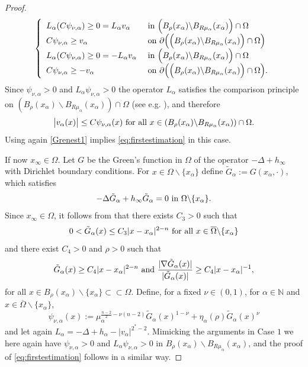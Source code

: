 \documentclass[10pt]{amsart}
\numberwithin{equation}{section}
\newcommand{\Om}{\Omega}
\newcommand{\ma}{\mu_\alpha}
\def \bb{\hbox}
\def \xl{x_\alpha}
\def\la{\alpha}
\def \ma{\mu_{\alpha}}
\def \nn{\mathbb{N}}
\def \ro{\rho}
\theoremstyle{plain}
\theoremstyle{remark}
\begin{document}
\begin{proof}
\begin{equation}\label{eq:critlambda}
\left\{\begin{array}{ll}
L_{\la} (C\psi_{\nu,\la})\geq 0=L_{\la} v_{\la} &\hbox{ in }\Big( B_{\ro}(\xl) \backslash B_{R\ma}(\xl)\Big) \cap \Om\\
C\psi_{\nu,\la}\geq  v_{\la}&\hbox{ on }\partial \Big( \Big( B_{\ro}(\xl) \backslash B_{R\ma}(\xl)\Big) \cap \Om\Big)\\
L_{\la}(C\psi_{\nu,\la})\geq 0=-L_{\la} v_{\la} &\hbox{ in }  \Big( B_{\ro}(\xl) \backslash B_{R\ma}(\xl)\Big) \cap \Om\\
C\psi_{\nu,\la}\geq  -v_{\la}&\hbox{ on }\partial \Big( \Big( B_{\ro}(\xl) \backslash B_{R\ma}(\xl)\Big) \cap \Om\Big).
\end{array}\right.
\end{equation}
Since 	$\psi_{\nu,\la}>0$ and $L_{\la}	\psi_{\nu,\la}>0$ the operator $L_{\la}$ satisfies the comparison principle on $\left(  B_{\ro}(\xl) \backslash B_{R\ma}(\xl)\right)  \cap \Om$ (see e.g. \cite{BNV}), and therefore 
\begin{equation*}
\big| v_{\la}(x)\big| \leq  C \psi_{\nu,\la}(x) \bb{ for all } x\in  \left(  B_{\ro}(\xl) \backslash B_{R\ma}(\xl)\right)  \cap \Om.
\end{equation*}
Using again \eqref{Grenest1} implies \eqref{eq:firstestimation} in this case.

\medskip

\smallskip{} If now $x_{\infty}\in\Om$. Let $G$ be the Green's function in $\Om$ of the operator $-\Delta +h_{\infty}$ with Dirichlet boundary conditions. For $x \in \Om \backslash \{\xl\}$ define $\tilde{G}_{\la}:=G(\xl,\cdot)$, which satisfies  
\begin{equation*} 
	-\Delta \tilde{G}_{\la} +h_{\infty}\tilde{G}_{\la}= 0 \bb{ in } \Om\backslash \{\xl\}.
\end{equation*}
Since $x_\infty \in \Om$, it follows from \cite{RobDirichlet} that there exists $C_3>0$ such that 
\begin{equation*} 
	0<\tilde{G}_{\la} (x) \leq C_3 |x-\xl|^{2-n} \bb{ for all } x\in \overline{\Om} \backslash \{\xl\}
\end{equation*}
and there exist $C_4>0$ and $\rho>0$ such that 
\begin{equation*} 
	\tilde{G}_{\la}(x)\geq C_4|x-\xl|^{2-n} \bb{ and } \frac{|\nabla \tilde{G}_{\la}(x)|}{|\tilde{G}_{\la}(x)|}\geq C_4 |x-\xl|^{-1},
\end{equation*}
for all $x\in B_{\rho}(\xl)\backslash \{\xl\}\subset\subset \Om$. Define, for a fixed $\nu \in (0,1)$, for $\alpha \in \nn$ and $x\in \overline{\Om} \backslash \{\xl\}$,
\begin{equation*}
	\psi_{\nu,\la}(x):=\ma^{\frac{n-2}{2}-\nu(n-2)}\tilde{G}_{\la}(x)^{1-\nu}+\eta_{\la}(\ro)\tilde{G}_{\la}(x)^{\nu}
\end{equation*}
and let again $L_{\la}=-\Delta +h_{\alpha} -|v_{\la}|^{2^*-2}$. Mimicking the arguments in Case $1$ we here again have $\psi_{\nu,\la} >0$ and $L_\alpha \psi_{\nu,\la} >0$ in $B_{\ro}(\xl) \backslash B_{R\ma}(\xl)$, and the proof of \eqref{eq:firstestimation} follows in a similar way. 
\end{proof}
\end{document}
